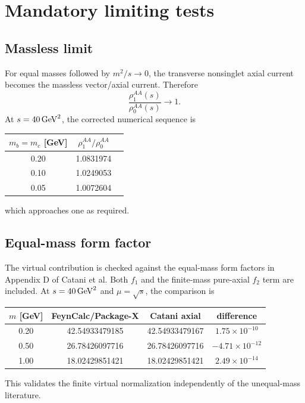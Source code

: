 \documentclass[11pt]{article}
\begin{document}
\section{Mandatory limiting tests}

\subsection{Massless limit}

For equal masses followed by \(m^2/s\to0\), the transverse nonsinglet axial
current becomes the massless vector/axial current.  Therefore
\begin{equation}
 \frac{\rho_1^{AA}(s)}{\rho_0^{AA}(s)}\longrightarrow1.
\end{equation}
At \(s=40\,{\rm GeV}^2\), the corrected numerical sequence is
\begin{center}
\begin{tabular}{ccc}
\toprule
\(m_b=m_c\) [GeV] & \(\rho_1^{AA}/\rho_0^{AA}\)\\
\midrule
0.20 & 1.0831974\\
0.10 & 1.0249053\\
0.05 & 1.0072604\\
\bottomrule
\end{tabular}
\end{center}
which approaches one as required.

\subsection{Equal-mass form factor}

The virtual contribution is checked against the equal-mass form factors in
Appendix D of Catani et al.  Both \(f_1\) and the finite-mass pure-axial
\(f_2\) term are included.  At \(s=40\,{\rm GeV}^2\) and
\(\mu=\sqrt{s}\), the comparison is
\begin{center}
\begin{tabular}{cccc}
\toprule
\(m\) [GeV] & FeynCalc/Package-X & Catani axial & difference\\
\midrule
0.20 & 42.54933479185 & 42.54933479167 & \(1.75\times10^{-10}\)\\
0.50 & 26.78426097716 & 26.78426097716 & \(-4.71\times10^{-12}\)\\
1.00 & 18.02429851421 & 18.02429851421 & \(2.49\times10^{-14}\)\\
\bottomrule
\end{tabular}
\end{center}
This validates the finite virtual normalization independently of the
unequal-mass literature.
\end{document}
